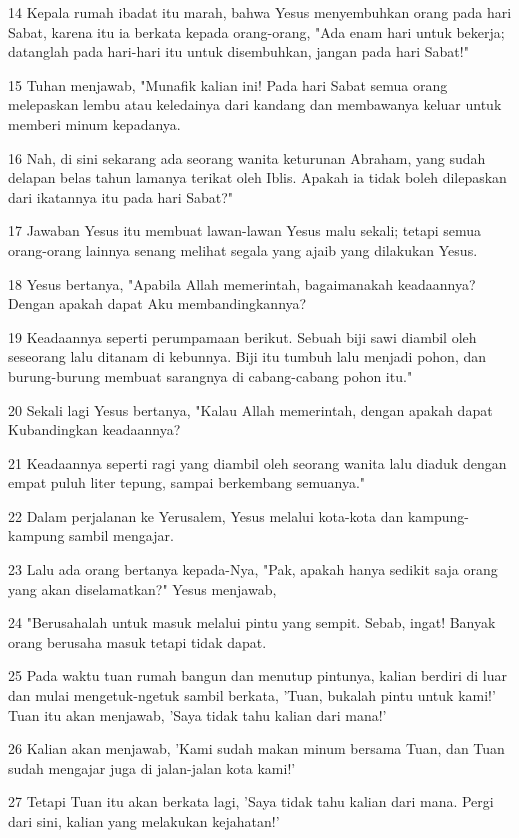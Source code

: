 \par 14 Kepala rumah ibadat itu marah, bahwa Yesus menyembuhkan orang pada hari Sabat, karena itu ia berkata kepada orang-orang, "Ada enam hari untuk bekerja; datanglah pada hari-hari itu untuk disembuhkan, jangan pada hari Sabat!"
\par 15 Tuhan menjawab, "Munafik kalian ini! Pada hari Sabat semua orang melepaskan lembu atau keledainya dari kandang dan membawanya keluar untuk memberi minum kepadanya.
\par 16 Nah, di sini sekarang ada seorang wanita keturunan Abraham, yang sudah delapan belas tahun lamanya terikat oleh Iblis. Apakah ia tidak boleh dilepaskan dari ikatannya itu pada hari Sabat?"
\par 17 Jawaban Yesus itu membuat lawan-lawan Yesus malu sekali; tetapi semua orang-orang lainnya senang melihat segala yang ajaib yang dilakukan Yesus.
\par 18 Yesus bertanya, "Apabila Allah memerintah, bagaimanakah keadaannya? Dengan apakah dapat Aku membandingkannya?
\par 19 Keadaannya seperti perumpamaan berikut. Sebuah biji sawi diambil oleh seseorang lalu ditanam di kebunnya. Biji itu tumbuh lalu menjadi pohon, dan burung-burung membuat sarangnya di cabang-cabang pohon itu."
\par 20 Sekali lagi Yesus bertanya, "Kalau Allah memerintah, dengan apakah dapat Kubandingkan keadaannya?
\par 21 Keadaannya seperti ragi yang diambil oleh seorang wanita lalu diaduk dengan empat puluh liter tepung, sampai berkembang semuanya."
\par 22 Dalam perjalanan ke Yerusalem, Yesus melalui kota-kota dan kampung-kampung sambil mengajar.
\par 23 Lalu ada orang bertanya kepada-Nya, "Pak, apakah hanya sedikit saja orang yang akan diselamatkan?" Yesus menjawab,
\par 24 "Berusahalah untuk masuk melalui pintu yang sempit. Sebab, ingat! Banyak orang berusaha masuk tetapi tidak dapat.
\par 25 Pada waktu tuan rumah bangun dan menutup pintunya, kalian berdiri di luar dan mulai mengetuk-ngetuk sambil berkata, 'Tuan, bukalah pintu untuk kami!' Tuan itu akan menjawab, 'Saya tidak tahu kalian dari mana!'
\par 26 Kalian akan menjawab, 'Kami sudah makan minum bersama Tuan, dan Tuan sudah mengajar juga di jalan-jalan kota kami!'
\par 27 Tetapi Tuan itu akan berkata lagi, 'Saya tidak tahu kalian dari mana. Pergi dari sini, kalian yang melakukan kejahatan!'
